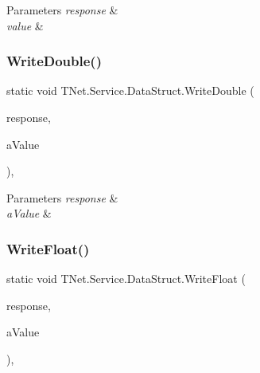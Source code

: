 \begin{DoxyParams}{Parameters}
{\em response} & \\
\hline
{\em value} & \\
\hline
\end{DoxyParams}
\mbox{\label{class_t_net_1_1_service_1_1_data_struct_a1a6d1148fadada00a8a1a9490393a3a1}} 
\subsubsection{\texorpdfstring{Write\+Double()}{WriteDouble()}}
{\footnotesize\ttfamily static void T\+Net.\+Service.\+Data\+Struct.\+Write\+Double (\begin{DoxyParamCaption}\item[{\mbox{\hyperlink{class_t_net_1_1_service_1_1_base_game_response}{Base\+Game\+Response}}}]{response,  }\item[{double}]{a\+Value }\end{DoxyParamCaption})\hspace{0.3cm}{\ttfamily [static]}, {\ttfamily [protected]}}






\begin{DoxyParams}{Parameters}
{\em response} & \\
\hline
{\em a\+Value} & \\
\hline
\end{DoxyParams}
\mbox{\label{class_t_net_1_1_service_1_1_data_struct_a71963b8cb015e81f2c808bf05f643ba0}} 
\subsubsection{\texorpdfstring{Write\+Float()}{WriteFloat()}}
{\footnotesize\ttfamily static void T\+Net.\+Service.\+Data\+Struct.\+Write\+Float (\begin{DoxyParamCaption}\item[{\mbox{\hyperlink{class_t_net_1_1_service_1_1_base_game_response}{Base\+Game\+Response}}}]{response,  }\item[{float}]{a\+Value }\end{DoxyParamCaption})\hspace{0.3cm}{\ttfamily [static]}, {\ttfamily [protected]}}






